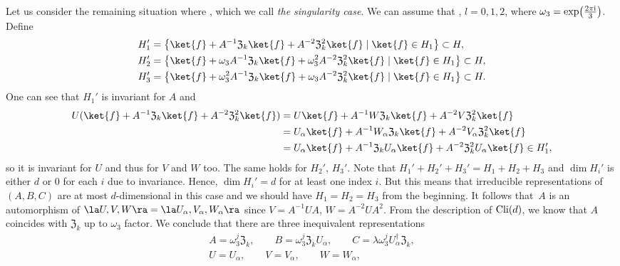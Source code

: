 Let us consider the remaining situation
where ,
which we call \textit{the singularity case}.
We can assume that , $l=0,1,2$,
where $\omega_3 = \exp\bigl(\frac{2\pi{\rm i}}{3}\bigr)$. Define
\begin{align*}
& H_1' = \bigl\{\ket{f} + A^{-1}\mathfrak{Z}_k\ket{f} + A^{-2}\mathfrak{Z}_k^{2}\ket{f} \mid  \ket{f} \in H_1 \bigr\} \subset H, \\
 &H_2' = \bigl\{\ket{f} + \omega_3A^{-1}\mathfrak{Z}_k\ket{f} + \omega_3^2A^{-2}\mathfrak{Z}_k^{2}\ket{f} \mid  \ket{f} \in H_1 \bigr\} \subset H, \\
& H_3' = \bigl\{\ket{f} + \omega_3^2A^{-1}\mathfrak{Z}_k\ket{f} + \omega_3A^{-2}\mathfrak{Z}_k^{2}\ket{f} \mid  \ket{f} \in H_1 \bigr\} \subset H.
\end{align*}
One can see that $H_1'$ is invariant for $A$
and
\begin{align*}
 U(\ket{f} + A^{-1}\mathfrak{Z}_k\ket{f} + A^{-2}\mathfrak{Z}_k^{2}\ket{f})
 &= U \ket{f} + A^{-1}W\mathfrak{Z}_k\ket{f} + A^{-2}V\mathfrak{Z}_k^{2}\ket{f} \\
 &= U_\alpha \ket{f} + A^{-1}W_\alpha\mathfrak{Z}_k\ket{f} + A^{-2}V_\alpha\mathfrak{Z}_k^{2}\ket{f}\\
& = U_\alpha \ket{f} + A^{-1}\mathfrak{Z}_kU_\alpha\ket{f} + A^{-2}\mathfrak{Z}_k^{2}U_\alpha\ket{f}
 \in H_1',
\end{align*}
so it is invariant for $U$ and thus for $V$ and $W$ too. The same holds
for $H_2'$, $H_3'$. Note that $H_1'+H_2'+H_3' = H_1+H_2+H_3$ and $\dim H_i'$ is
either $d$ or $0$ for each $i$ due to invariance.
Hence, $\dim H_i' = d$ for at least one index $i$.
But this means that irreducible representations of $(A,B,C)$
are at most $d$-dimensional in this case and we should have $H_1=H_2=H_3$
from the beginning.
It follows that~$A$ is an automorphism of $\la U, V, W\ra = \la U_\alpha, V_\alpha, W_\alpha\ra$
since $V = A^{-1}UA$, $W = A^{-2}UA^2$.
From the description of ${\rm Cli}(d)$, we know that $A$ coincides with $\mathfrak{Z}_k$ up to $\omega_3$ factor.
We conclude that there are three inequivalent representations
\begin{gather}
 A = \omega_3^j \mathfrak{Z}_k,
 \qquad B = \omega_3^j \mathfrak{Z}_k U_\alpha,
\qquad C = \lambda \omega_3^j U_\alpha^\dag \mathfrak{Z}_k,\nonumber \\
 U = U_\alpha,
\qquad V = V_\alpha,
\qquad W = W_\alpha,\label{tri:aaasol}
\end{gather}
